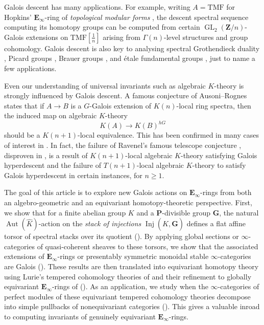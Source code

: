 \documentclass[11pt, a4paper]{article}
\DeclareMathOperator{\GL}{GL}
\newcommand{\1}{\mathbf{1}}
\newcommand{\TMF}{\mathrm{TMF}}
\DeclareMathOperator{\Inj}{Inj}
\DeclareMathOperator{\Aut}{Aut}
\newcommand{\dual}[1]{{\widehat{#1}}}
\newcommand{\E}{\mathbf{E}}
\newcommand{\G}{\mathbf{G}}
\renewcommand{\P}{\mathbf{P}}
\newcommand{\Z}{\mathbf{Z}}
\newcommand{\Ga}{\Gamma}
\theoremstyle{plain}
\theoremstyle{definition}
\theoremstyle{remark}\numberwithin{equation}{section}
\begin{document}
Galois descent has many applications. For example, writing $A=\TMF$ for Hopkins' $\E_\infty$-ring of \emph{topological modular forms} \cite{hopkinsfirsttmficm,hopkinssecondtmficm}, the descent spectral sequence computing its homotopy groups can be computed from certain $\GL_2(\Z/n)$-Galois extensions on $\TMF[\tfrac{1}{n}]$ arising from $\Ga(n)$-level structures and group cohomology. Galois descent is also key to analysing spectral Grothendieck duality \cite{drewvesna,vesnaduality}, Picard groups \cite{lennartandhill,mathewstoja,tmfwls}, Brauer groups \cite{antieau_meier_stojanoska_brauergrouptmf,gepnerlawson}, and étale fundamental groups \cite{mathew_Galois}, just to name a few applications.

Even our understanding of universal invariants such as algebraic $K$-theory is strongly influenced by Galois descent. A famous conjecture of Ausoni--Rognes \cite[Conj.1.2]{chromatic_red_shift_ausoni_rognes} states that if $A \to B$ is a $G$-Galois extension of $K(n)$-local ring spectra, then the induced map on algebraic $K$-theory
\[K(A) \to K(B)^{hG}\]
should be a $K(n+1)$-local equivalence. This has been confirmed in many cases of interest in \cite{BMCSY_descent_cyclotomic_redshift,CMNN_descent_and_AR_conjecture,CMNN_descent_and_vanishing}. In fact, the failure of Ravenel's famous telescope conjecture \cite{ravenellocalisation}, disproven in \cite{telescope}, is a result of $K(n+1)$-local algebraic $K$-theory satisfying Galois hyperdescent and the failure of $T(n+1)$-local algebraic $K$-theory to satisfy Galois hyperdescent in certain instances, for $n\geq 1$.

The goal of this article is to explore new Galois actions on $\E_\infty$-rings from both an algebro-geometric and an equivariant homotopy-theoretic perspective. First, we show that for a finite abelian group $K$ and a $\P$-divisible group $\G$, the natural $\Aut(\dual{K})$-action on the \emph{stack of injections} $\Inj(\dual{K}, \G)$ defines a flat affine torsor of spectral stacks over its quotient (). By applying global sections or $\infty$-categories of quasi-coherent sheaves to these torsors, we show that the associated extensions of $\E_\infty$-rings or presentably symmetric monoidal stable $\infty$-categories are Galois (). These results are then translated into equivariant homotopy theory using Lurie's tempered cohomology theories of \cite{ec3} and their refinement to globally equivariant $\E_\infty$-rings of \cite{temperedglobal} (). As an application, we study when the $\infty$-categories of perfect modules of these equivariant tempered cohomology theories decompose into simple pullbacks of nonequivariant categories (). This gives a valuable inroad to computing invariants of genuinely equivariant $\E_\infty$-rings.
\end{document}
